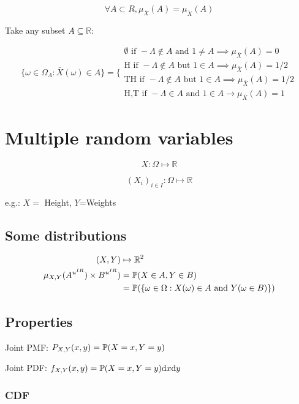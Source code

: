 $$
\forall A \subset R, \mu_{\bar{X}}(A)=\mu_{\tilde{X}}(A)
$$

\bigskip

Take any subset $A\subseteq \mathbb{R}$:

$$
\{ \omega\in\Omega_{\Lambda}:\bar{X}(\omega)\in A \}=
\Bigg\{
\begin{matrix}
\emptyset \text{ if }-\Lambda\not\in A \text{ and }1 \neq A \implies\mu_{\bar{X}}(A)=0
\\
\text{H} \text{ if }-\Lambda\not\in A \text{ but } 1\in A \implies\mu_{\bar{X}}(A)=1/2
\\
\text{T} \text{H} \text{ if }-\Lambda\not\in A \text{ but }1 \in A \implies\mu_{\bar{X}}(A)=1/2
\\
\text{H,T} \text{ if }-\Lambda\in A \text{ and }1 \in A\rightarrow \mu_{\bar{X}}(A)=1
\end{matrix}
$$

\section{Multiple random variables}

$$
X:\Omega \mapsto \mathbb{R}
$$

$$
(X_i)_{i\in I}:\Omega \mapsto \mathbb{R}
$$

e.g.: $X=$ Height, $Y$=Weights

\subsection{Some distributions}

\begin{align*}
(X,Y)&\mapsto \mathbb{R}^2
\\
\mu_{X,Y}(A^{u^{IR}})\times B^{u^{IR}})&=\mathbb{P}(X\in A, Y\in B)
\\
&=\mathbb{P}(\{ \omega\in\Omega: X(\omega)\in A \text{ and }Y(\omega\in B) \})
\end{align*}

\subsection{Properties}

Joint PMF: $P_{X,Y}(x,y)=\mathbb{P}(X=x,Y=y)$

Joint PDF: $f_{X,Y}(x,y)=\mathbb{P}(X=x,Y=y)\text{d}x\text{d}y$

\subsubsection{CDF}

